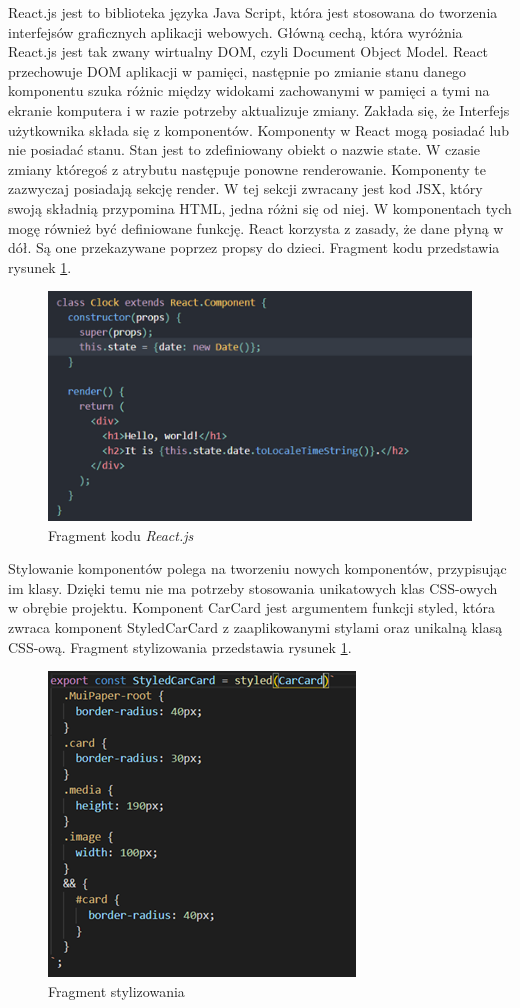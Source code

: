 \documentclass[12pt]{article}
\begin{document}
React.js jest to biblioteka języka Java Script, która jest stosowana do tworzenia interfejsów graficznych aplikacji webowych. Główną cechą, która wyróżnia React.js jest tak zwany wirtualny DOM, czyli Document Object Model. React przechowuje DOM aplikacji w pamięci, następnie po zmianie stanu danego komponentu szuka różnic między widokami zachowanymi w pamięci a tymi na ekranie komputera i w razie potrzeby aktualizuje zmiany. Zakłada się, że Interfejs użytkownika składa się z komponentów. Komponenty w React mogą posiadać lub nie posiadać stanu. Stan jest to zdefiniowany obiekt o nazwie state. W czasie zmiany któregoś z atrybutu następuje ponowne renderowanie. Komponenty te zazwyczaj posiadają sekcję render. W tej sekcji zwracany jest kod JSX, który swoją składnią przypomina HTML, jedna różni się od niej. W komponentach tych mogę również być definiowane funkcję. React korzysta z zasady, że dane płyną w dół. Są one przekazywane poprzez propsy do dzieci. Fragment kodu przedstawia rysunek \ref{web1}.
\begin{figure}[H]
		\centering
		\includegraphics[scale=1]{web1.png}
		\caption{Fragment kodu \textit{React.js}}
		\label{web1}
	\end{figure}
	
Stylowanie komponentów polega na tworzeniu nowych komponentów, przypisując im klasy. Dzięki temu nie ma potrzeby stosowania unikatowych klas CSS-owych w obrębie projektu. Komponent CarCard jest argumentem funkcji styled, która zwraca komponent StyledCarCard z zaaplikowanymi stylami oraz unikalną klasą CSS-ową. Fragment stylizowania przedstawia rysunek \ref{web1}.

 \begin{figure}[H]
		\centering
		\includegraphics[scale=1]{web2.png}
		\caption{Fragment stylizowania}
		\label{web2}
	\end{figure}
	
\end{document}
